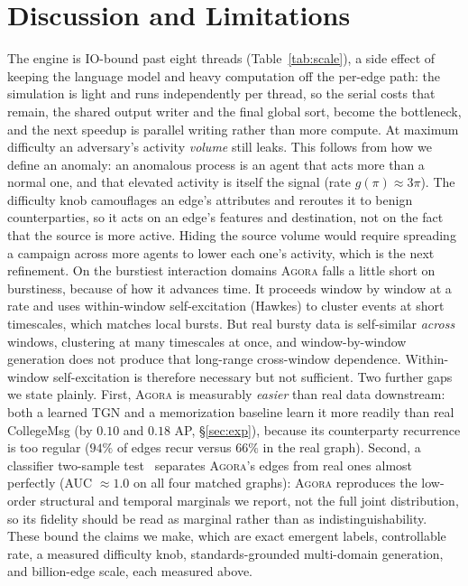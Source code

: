 \documentclass[sigconf,review,anonymous]{acmart}
\newcommand{\sys}{\textsc{Agora}\xspace}
\begin{document}
\section{Discussion and Limitations}
The engine is IO-bound past eight threads
(Table~\ref{tab:scale}), a side effect of keeping the language model and heavy
computation off the per-edge path: the simulation is light and runs independently per
thread, so the serial costs that remain, the shared output writer and the final global
sort, become the bottleneck, and the next speedup is parallel writing rather than more
compute. At maximum difficulty an adversary's activity \emph{volume} still leaks. This
follows from how we define an anomaly: an anomalous process is an agent that acts more
than a normal one, and that elevated activity is itself the signal (rate
$g(\pi)\approx 3\pi$). The difficulty knob camouflages an edge's attributes and reroutes
it to benign counterparties, so it acts on an edge's features and destination, not on
the fact that the source is more active. Hiding the source volume would require
spreading a campaign across more agents to lower each one's activity, which is the next
refinement. On the burstiest interaction domains \sys{} falls a little short on
burstiness, because of how it advances time. It proceeds window by window at a rate and
uses within-window self-excitation (Hawkes) to cluster events at short timescales, which
matches local bursts. But real bursty data is self-similar \emph{across} windows,
clustering at many timescales at once, and window-by-window generation does not produce
that long-range cross-window dependence. Within-window self-excitation is therefore
necessary but not sufficient. Two further gaps we state plainly. First, \sys{} is
measurably \emph{easier} than real data downstream: both a learned TGN and a memorization
baseline learn it more readily than real CollegeMsg (by $0.10$ and $0.18$ AP,
\S\ref{sec:exp}), because its counterparty recurrence is too regular ($94\%$ of edges
recur versus $66\%$ in the real graph). Second, a classifier two-sample
test~\cite{lopezpaz2017c2st} separates \sys{}'s edges from real ones almost perfectly
(AUC $\approx\!1.0$ on all four matched graphs): \sys{} reproduces the low-order
structural and temporal marginals we report, not the full joint distribution, so its
fidelity should be read as marginal rather than as indistinguishability. These bound the
claims we make, which are exact emergent labels, controllable rate, a measured difficulty
knob, standards-grounded multi-domain generation, and billion-edge scale, each measured
above.
\end{document}

